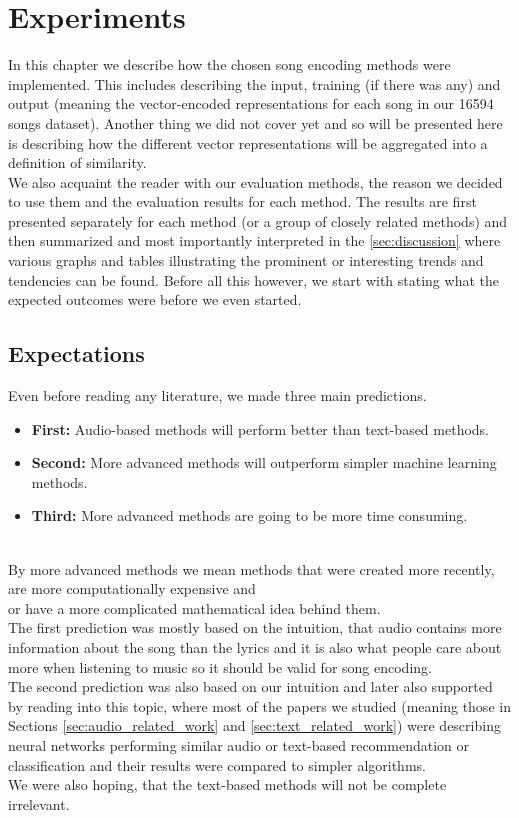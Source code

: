 \chapter{Experiments}\label{chap:experiments}

In this chapter we describe how the chosen song encoding methods were implemented. This includes describing the input, training (if there was any) and output (meaning the vector-encoded representations for each song in our 16594 songs dataset). Another thing we did not cover yet and so will be presented here is describing how the different vector representations will be aggregated into a definition of similarity.\\
We also acquaint the reader with our evaluation methods, the reason we decided to use them and the evaluation results for each method. The results are first presented separately for each method (or a group of closely related methods) and then summarized and most importantly interpreted in the \ref{sec:discussion} where various graphs and tables illustrating the prominent or interesting trends and tendencies can be found. Before all this however, we start with stating what the expected outcomes were before we even started.

\section{Expectations}

Even before reading any literature, we made three main predictions. 
\begin{itemize}
    \item \textbf{First:} Audio-based methods will perform better than text-based methods.
    \item \textbf{Second:} More advanced methods will outperform simpler machine learning methods.
    \item \textbf{Third:} More advanced methods are going to be more time consuming.
\end{itemize} \\
By more advanced methods we mean methods that were created more recently, are more computationally expensive and\\or have a more complicated mathematical idea behind them. \\
The first prediction was mostly based on the intuition, that audio contains more information about the song than the lyrics and it is also what people care about more when listening to music so it should be valid for song encoding. \\
The second prediction was also based on our intuition and later also supported by reading into this topic, where most of the papers we studied (meaning those in Sections \ref{sec:audio_related_work} and \ref{sec:text_related_work}) were describing neural networks performing similar audio or text-based recommendation or classification and their results were compared to simpler algorithms. \\
We were also hoping, that the text-based methods will not be complete irrelevant.

